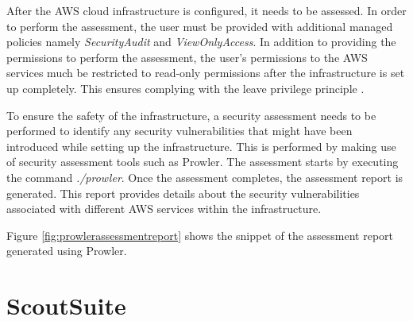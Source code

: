 \par After the AWS cloud infrastructure is configured, it needs to be assessed.
In order to perform the assessment, the user must be provided with additional managed policies namely \textit{SecurityAudit} and \textit{ViewOnlyAccess}.
In addition to providing the permissions to perform the assessment, the user’s permissions to the AWS services much be restricted to read-only permissions after the infrastructure is set up completely.
This ensures complying with the leave privilege principle \cite{80}.

\par To ensure the safety of the infrastructure, a security assessment needs to be performed to identify any security vulnerabilities that might have been introduced while setting up the infrastructure.
This is performed by making use of security assessment tools such as Prowler.
The assessment starts by executing the command \textit{./prowler}.
Once the assessment completes, the assessment report is generated.
This report provides details about the security vulnerabilities associated with different AWS services within the infrastructure.

Figure \ref{fig:prowlerassessmentreport} shows the snippet of the assessment report generated using Prowler.


\hfill \break
\section{ScoutSuite}

